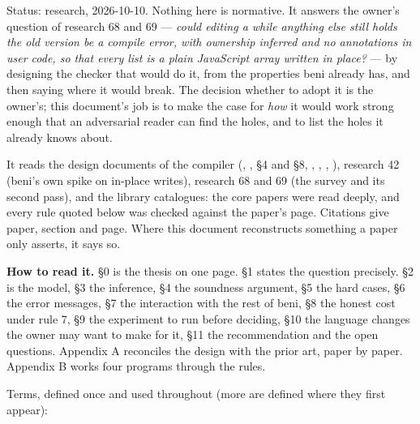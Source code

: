 Status: research, 2026-10-10. Nothing here is normative. It answers the owner's question of research 68 and 69 — \emph{could editing a  while anything else still holds the old version be a compile error, with ownership inferred and no annotations in user code, so that every list is a plain JavaScript array written in place?} — by designing the checker that would do it, from the properties beni already has, and then saying where it would break. The decision whether to adopt it is the owner's; this document's job is to make the case for \emph{how} it would work strong enough that an adversarial reader can find the holes, and to list the holes it already knows about.

It reads the design documents of the compiler (, ,  §4 and §8, , , , ), research 42 (beni's own spike on in-place writes), research 68 and 69 (the survey and its second pass), and the library  catalogues: the core papers were read deeply, and every rule quoted below was checked against the paper's page. Citations give paper, section and page. Where this document reconstructs something a paper only asserts, it says so.

\textbf{How to read it.} §0 is the thesis on one page. §1 states the question precisely. §2 is the model, §3 the inference, §4 the soundness argument, §5 the hard cases, §6 the error messages, §7 the interaction with the rest of beni, §8 the honest cost under rule 7, §9 the experiment to run before deciding, §10 the language changes the owner may want to make for it, §11 the recommendation and the open questions. Appendix A reconciles the design with the prior art, paper by paper. Appendix B works four programs through the rules.

Terms, defined once and used throughout (more are defined where they first appear):

